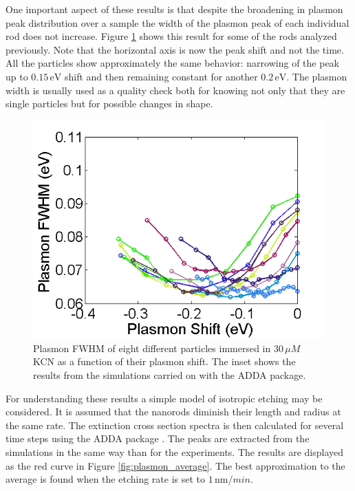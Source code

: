 \documentclass[twocolumn]{article}
\begin{document}
One important aspect of these results is that despite the broadening in plasmon
peak distribution over a sample the width of the plasmon peak of each individual
rod does not increase. Figure \ref{fig:FWHM} shows this result for some of the
rods analyzed previously. Note that the horizontal axis is now the peak shift
and not the time. All the particles show approximately the same behavior:
narrowing of the peak up to $0.15\,\textrm{eV}$ shift and then remaining
constant for another $0.2\,\textrm{eV}$.
The plasmon width is usually used as a quality check both for knowing not only
that they are single particles but for possible changes in shape.

\begin{figure}[tp]
 \centering
 \includegraphics[width=0.95\linewidth]{fwhm_several_in_eV.png}
 \caption{Plasmon FWHM of eight different particles immersed in $30\,\mu M$ KCN
 as a function of their plasmon shift. The inset shows the results from the
 simulations carried on with the ADDA package.}
 \label{fig:FWHM}
\end{figure}

For understanding these results a simple model of isotropic etching may be
considered. It is assumed that the nanorods diminish their length and radius at
the same rate. The extinction cross section spectra is then calculated for
several time steps using the ADDA package \cite{Yurkin2011}. The peaks are
extracted from the simulations in the same way than for the experiments. The
results are displayed as the red curve in Figure \ref{fig:plasmon_average}. The
best approximation to the average is found when the etching rate is set to
$1\,\textrm{nm}/min$.
\end{document}
